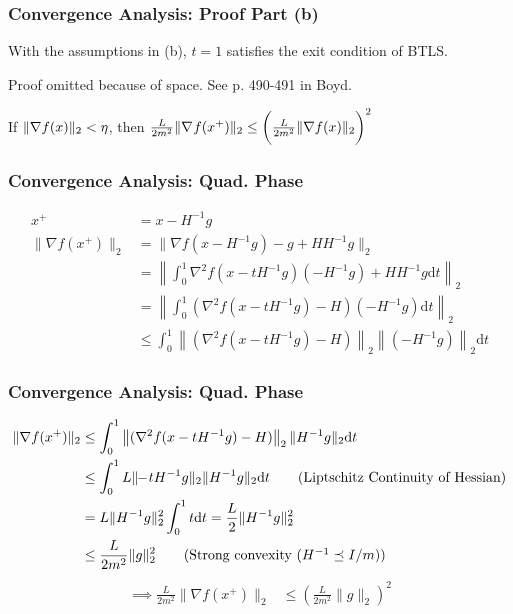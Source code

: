 \documentclass{beamer}
\begin{document}
\begin{frame}
    \frametitle{Convergence Analysis: Proof Part (b)}
    \begin{lemma}
        With the assumptions in (b), $t = 1$ satisfies the exit condition of BTLS.
    \end{lemma}
    Proof omitted because of space.  See p. 490-491 in Boyd.
    \begin{lemma}
        If $\|\nabla f(x)\|_2 < \eta$, then 
        $ \frac{L}{2m^2} \|\nabla_{} f (x^{+})\|_2 \leq
                \bigg(\frac{L}{2m^2} \|\nabla f(x)\|_2 \bigg)^2 $
    \end{lemma}

\end{frame}

\begin{frame}
    \frametitle{Convergence Analysis: Quad. Phase}
    \begin{align}
    x^+ &= x - H^{-1}g \tag{BTLS Quad. Lemma} \\
    \| \nabla f(x^{+})\|_2 &= \| \nabla f(x-H^{-1}g) - g + HH^{-1}g \|_2 \tag{Add zero} \\
	&= \left\|\int_{0}^{1} \nabla^2 f(x-tH^{-1}g) (-H^{-1}g) + HH^{-1}g \mathrm{d}t \right\|_2 \tag{Fund. Theorem of Calculus} \\
	&= \left\| \int_{0}^{1} (\nabla^2 f(x-tH^{-1}g) - H) (-H^{-1}g) \mathrm{d}t \right\|_2 \tag{Rearrange} \\
	&\leq \int_{0}^{1} \left\| (\nabla^2 f(x-tH^{-1}g) - H)\right\|_2 \left\| (-H^{-1}g)\right\|_2 \mathrm{d}t  \tag{Triangle inequality of norms}
    \end{align}
\end{frame}

\begin{frame}
    \frametitle{Convergence Analysis: Quad. Phase}
    \begin{align}
    \| \nabla f(x^{+})\|_2 &\leq \int_{0}^{1} \left\| (\nabla^2 f(x-tH^{-1}g) - H)\right\|_2 \|H^{-1}g\|_2 \mathrm{d}t \notag \\
	&\leq \int_{0}^{1} L \| \!\!-\!tH^{-1}g \|_2 \|H^{-1}g\|_2 \mathrm{d}t \tag{Liptschitz Continuity of Hessian} \\
	&= L \|H^{-1}g\|_2^2 \int_{0}^{1} t \mathrm{d}t = \frac{L}{2} \|H^{-1}g\|_2^2 \notag \\	
	&\leq \frac{L}{2m^2} \|g\|_2^2 \tag{Strong convexity ($H^{-1} \preceq I/m$)}
	\end{align}
	\begin{align}
 	\implies \frac{L}{2m^2} \| \nabla f(x^{+})\|_2 &\leq \left( \frac{L}{2m^2} \|g\|_2 \right)^2
    \end{align}
\end{frame}

\end{document}
